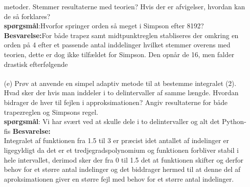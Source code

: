 metoder. Stemmer resultaterne med teorien? Hvis der er afvigelser, hvordan kan
de så forklares?\\
\textbf{spørgsmål}:Hvorfor springer orden så meget i Simpson efter 8192? \\
\textbf{Besvarelse:}For både trapez samt midtpunktreglen stabliseres der omkring en orden på 4 efter et passende antal inddelinger hvilket stemmer overens med teorien, dette er dog ikke tilfældet for Simpson. Den opnår de 16, men falder drastisk efterfølgende \\\\
(e) Prøv at anvende en simpel adaptiv metode til at bestemme integralet (2). Hvad
sker der hvis man inddeler i to delintervaller af samme længde. Hvordan bidrager de hver til fejlen i approksimationen? 
Angiv resultaterne for både trapezreglen og Simpsons regel. \\
\textbf{spørgsmål}: Vi har svært ved at skulle dele i to delintervaller og alt det Python-fis
\textbf{Besvarelse:} \\
Integralet af funktionen fra 1.5 til 3 er præcist idet antallet af indelinger er ligegyldigt da det er et tredjegradspolynomium og funktionen forbliver stabil i hele intervallet, derimod sker der fra 0 til 1.5 det at funktionen skifter og derfor behov for et større antal indelinger og det biddrager hermed til at denne del af aproksimationen giver en større fejl med behov for et større antal indelinger.
%
